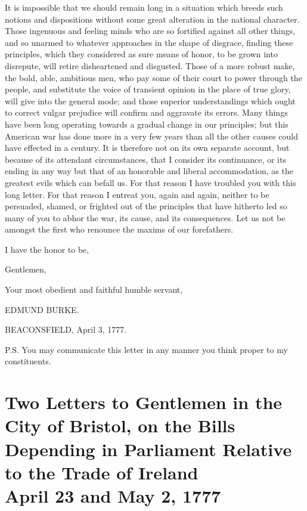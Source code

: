 It is impossible that we should remain long in a situation which breeds such notions and dispositions without some great alteration in the national character. Those ingenuous and feeling minds who are so fortified against all other things, and so unarmed to whatever approaches in the shape of disgrace, finding these principles, which they considered as sure means of honor, to be grown into disrepute, will retire disheartened and disgusted. Those of a more robust make, the bold, able, ambitious men, who pay some of their court to power through the people, and substitute the voice of transient opinion in the place of true glory, will give into the general mode; and those superior understandings which ought to correct vulgar prejudice will confirm and aggravate its errors. Many things have been long operating towards a gradual change in our principles; but this American war has done more in a very few years than all the other causes could have effected in a century. It is therefore not on its own separate account, but because of its attendant circumstances, that I consider its continuance, or its ending in any way but that of an honorable and liberal accommodation, as the greatest evils which can befall us. For that reason I have troubled you with this long letter. For that reason I entreat you, again and again, neither to be persuaded, shamed, or frighted out of the principles that have hitherto led so many of you to abhor the war, its cause, and its consequences. Let us not be amongst the first who renounce the maxims of our forefathers.

\vspace{0.3cm}
\hspace{1in}I have the honor to be,

\hspace{2.5in}Gentlemen,

Your most obedient and faithful humble servant,

\hfill EDMUND BURKE.

BEACONSFIELD, April 3, 1777.

\vspace{0.3cm}
P.S. You may communicate this letter in any manner you think proper to my constituents.


\chapter*[Two Letters to Gentlemen of Bristol]{
Two Letters to Gentlemen in the City of Bristol,
on the Bills Depending in Parliament Relative to the Trade of Ireland
\\ \vspace{0.1cm}\large{April 23 and May 2, 1777}}

